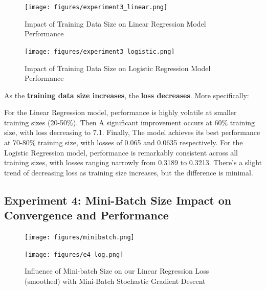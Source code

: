 \documentclass{article}
\begin{document}
\begin{figure}[H]
    \centering
    \begin{minipage}{0.45\textwidth}  %
        \centering
        \texttt{[image: figures/experiment3\_linear.png]}  %
        \caption{Impact of Training Data Size on Linear Regression Model Performance}
        \label{linear train size figure}
    \end{minipage}
    \hfill
    \begin{minipage}{0.45\textwidth}  %
        \centering
        \texttt{[image: figures/experiment3\_logistic.png]}  %

        \caption{Impact of Training Data Size on Logistic Regression Model Performance}
        \label{logistic train size figure}
    \end{minipage}
\end{figure}

As the \textbf{training data size increases}, the \textbf{loss decreases}. More specifically:

For the Linear Regression model, performance is highly volatile at smaller training sizes (20-50\%). Then A significant improvement occurs at 60\% training size, with loss decreasing to 7.1. Finally, The model achieves its best performance at 70-80\% training size, with losses of 0.065 and 0.0635 respectively. For the Logistic Regression model, performance is remarkably consistent across all training sizes, with losses ranging narrowly from 0.3189 to 0.3213. There's a slight trend of decreasing loss as training size increases, but the difference is minimal.

\subsection{Experiment 4: Mini-Batch Size Impact on Convergence and Performance}

\begin{figure}[h]
    \centering
    \begin{minipage}{0.49\textwidth}
        \centering
        \texttt{[image: figures/minibatch.png]}
    \end{minipage}
    \hfill
    \begin{minipage}{0.49\textwidth}
        \centering
        \texttt{[image: figures/e4\_log.png]}
    \end{minipage}
    \caption{Influence of Mini-batch Size on our Linear Regression Loss (smoothed) with Mini-Batch Stochastic Gradient Descent}
    \label{minibatch}
\end{figure}
\end{document}
